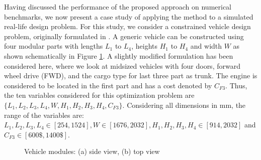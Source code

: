 \documentclass[twocolumn,10pt]{asme2ej}
\begin{document}
Having discussed the performance of the proposed approach on numerical benchmarks, we now present a case study of applying the method to a simulated real-life design problem. For this study, we consider a constrained {\color{blue}vehicle design} problem, originally formulated in \cite{KHTbarnum2010car}. A generic vehicle can be constructed using four modular parts with lengths $L_1$ to $L_4$, heights $H_1$ to $H_4$ and width $W$ as shown schematically in Figure \ref{fig:car}. A slightly modified formulation has been considered here, where we look at midsized vehicles with four doors, forward wheel drive (FWD), and the cargo type for last three part as trunk. The engine is considered to be located in the first part and has a cost denoted by $C_{F3}$. Thus, the ten variables considered for this optimization problem are $\{L_1, L_2, L_3, L_4, W, H_1, H_2, H_3, H_4, C_{F3}\}$. Considering all dimensions in mm, the range of the variables are: $L_1, L_2, L_3, L_4 \in [254,1524], W \in [1676,2032], H_1,H_2,H_3,H_4 \in [914,2032]$ and $C_{F3} \in [600\$,1400\$]$.

\begin{figure}[!htb]
	\centering    
	\caption{Vehicle modules: (a) side view, (b) top view}
	\label{fig:car}
\end{figure}
\end{document}
